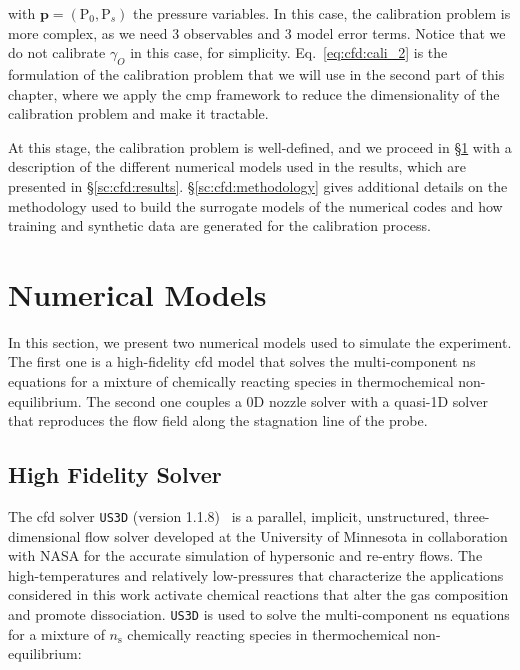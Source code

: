 with $\mathbf{p} = (\mathrm{P}_0, \mathrm{P}_s)$ the pressure variables. In this case, the calibration problem is more complex, as we need 3 observables and 3 model error terms. Notice that we do not calibrate $\gamma_O$ in this case, for simplicity. Eq.~\eqref{eq:cfd:cali_2} is the formulation of the calibration problem that we will use in the second part of this chapter, where we apply the \gls{cmp} framework to reduce the dimensionality of the calibration problem and make it tractable.  

\smallskip
At this stage, the calibration problem is well-defined, and we proceed in \S\ref{sc:cfd:numericalmodel} with a description of the different numerical models used in the results, which are presented in \S\ref{sc:cfd:results}. \S\ref{sc:cfd:methodology} gives additional details on the methodology used to build the surrogate models of the numerical codes and how training and synthetic data are generated for the calibration process.


\section{Numerical Models}
\label{sc:cfd:numericalmodel}

In this section, we present two numerical models used to simulate the experiment. The first one is a high-fidelity \gls{cfd} model that solves the multi-component \gls{ns} equations for a mixture of chemically reacting species in thermochemical non-equilibrium. The second one couples a 0D nozzle solver with a quasi-1D solver that reproduces the flow field along the stagnation line of the probe. 

\subsection{High Fidelity Solver}
\label{sc:cfd:us3D}

The \gls{cfd} solver \texttt{US3D} (version 1.1.8)~\cite{US3D} is a parallel, implicit, unstructured, three-dimensional flow solver developed at the University of Minnesota in collaboration with NASA for the accurate simulation of hypersonic and re-entry flows. The high-temperatures and relatively low-pressures that characterize the applications considered in this work activate chemical reactions that alter the gas composition and promote dissociation. \texttt{US3D} is used to solve the multi-component \gls{ns} equations for a mixture of \(n_\text{s}\) chemically reacting species in thermochemical non-equilibrium:


